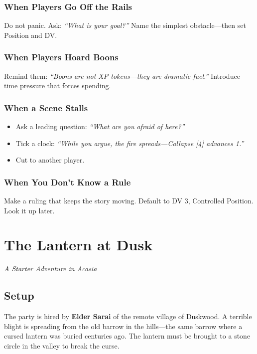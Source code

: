 \documentclass[10pt]{article}
\begin{document}
\subsubsection{When Players Go Off the Rails}
Do not panic. Ask: \textit{``What is your goal?''} Name the simplest obstacle—then set Position and DV.

\subsubsection{When Players Hoard Boons}
Remind them: \textit{``Boons are not XP tokens—they are dramatic fuel.''} Introduce time pressure that forces spending.

\subsubsection{When a Scene Stalls}
\begin{itemize}[leftmargin=*]
    \item Ask a leading question: \textit{``What are you afraid of here?''}
    \item Tick a clock: \textit{``While you argue, the fire spreads—Collapse [4] advances 1.''}
    \item Cut to another player.
\end{itemize}

\subsubsection{When You Don't Know a Rule}
Make a ruling that keeps the story moving. Default to DV 3, Controlled Position. Look it up later.

\section{The Lantern at Dusk}
\textit{A Starter Adventure in Acasia}

\subsection{Setup}
The party is hired by \textbf{Elder Sarai} of the remote village of Duskwood. A terrible blight is spreading from the old barrow in the hills—the same barrow where a cursed lantern was buried centuries ago. The lantern must be brought to a stone circle in the valley to break the curse.
\end{document}
